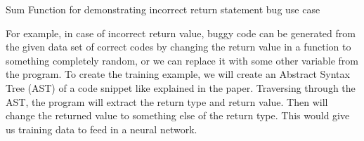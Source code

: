 \documentclass[sigconf]{acmart}
\begin{document}
\begin{algorithm}[H]
\caption{Sum Function for demonstrating incorrect return statement bug use case}
\begin{flushleft}

 
  \;
\end{flushleft}
\end{algorithm}


\iffalse
For example, in case of incorrect return value, buggy code can be generated from the given data set of correct codes by changing the return value in a function to something completely random, or we can replace it with some other variable from the program. To create the training example,  we will create an Abstract Syntax Tree (AST) of a code snippet like explained in the paper. Traversing through the AST, the program will extract the return type and return value.  Then will change the returned value to something else of the return type. This would give us training data to feed in a neural network. 
\end{document}
